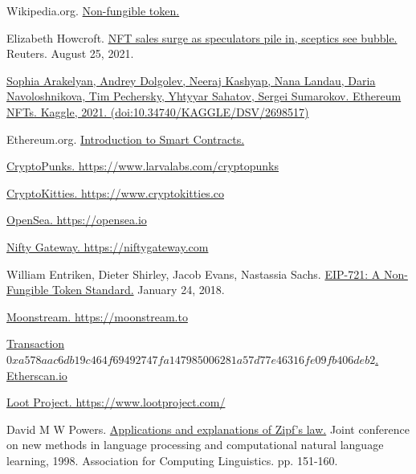 \documentclass{article}
\begin{document}
\begin{thebibliography}{2}

 Wikipedia.org. \href{https://en.wikipedia.org/wiki/Non-fungible_token}{Non-fungible token.}

 Elizabeth Howcroft. \href{https://www.reuters.com/technology/nft-sales-surge-speculators-pile-sceptics-see-bubble-2021-08-25/}{NFT sales surge as speculators pile in, sceptics see bubble.} Reuters. August 25, 2021.

 \href{https://www.kaggle.com/simiotic/ethereum-nfts}{Sophia Arakelyan, Andrey Dolgolev, Neeraj Kashyap, Nana Landau, Daria Navoloshnikova, Tim Pechersky, Yhtyyar Sahatov, Sergei Sumarokov. \href{https://www.kaggle.com/simiotic/ethereum-nfts}{Ethereum NFTs}. Kaggle, 2021. (doi:10.34740/KAGGLE/DSV/2698517)}

 Ethereum.org. \href{https://ethereum.org/en/developers/docs/smart-contracts/}{Introduction to Smart Contracts.}

 \href{https://www.larvalabs.com/cryptopunks}{CryptoPunks. https://www.larvalabs.com/cryptopunks}

 \href{https://www.cryptokitties.co/}{CryptoKitties. https://www.cryptokitties.co}

 \href{https://opensea.io/}{OpenSea. https://opensea.io}

 \href{https://niftygateway.com/}{Nifty Gateway. https://niftygateway.com}

 William Entriken, Dieter Shirley, Jacob Evans, Nastassia Sachs. \href{https://github.com/ethereum/eips/issues/721}{EIP-721: A Non-Fungible Token Standard.} January 24, 2018.

 \href{https://moonstream.to}{Moonstream. https://moonstream.to}

 \href{https://etherscan.io/tx/0xa578aac6db19c464f69492747fa147985006281a57d77e46316fe09fb406deb2}{Transaction $0xa578aac6db19c464f69492747fa147985006281a57d77e46316fe09fb406deb2$. Etherscan.io}

 \href{https://www.lootproject.com/}{Loot Project. https://www.lootproject.com/}

 David M W Powers. \href{https://aclanthology.org/W98-1218/}{Applications and explanations of Zipf's law.} Joint conference on new methods in language processing and computational natural language learning, 1998. Association for Computing Linguistics. pp. 151-160.


\end{thebibliography}
\end{document}
